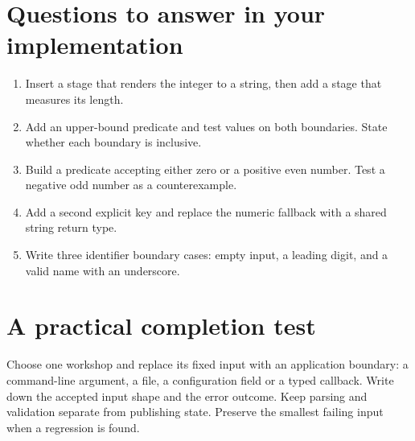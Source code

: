\section*{Questions to answer in your implementation}
\begin{enumerate}
\item Insert a stage that renders the integer to a string, then add a stage that measures its length.
\item Add an upper-bound predicate and test values on both boundaries. State whether each boundary is inclusive.
\item Build a predicate accepting either zero or a positive even number. Test a negative odd number as a counterexample.
\item Add a second explicit key and replace the numeric fallback with a shared string return type.
\item Write three identifier boundary cases: empty input, a leading digit, and a valid name with an underscore.
\end{enumerate}
\section*{A practical completion test}
Choose one workshop and replace its fixed input with an application boundary: a command-line argument, a file, a configuration field or a typed callback. Write down the accepted input shape and the error outcome. Keep parsing and validation separate from publishing state. Preserve the smallest failing input when a regression is found.

